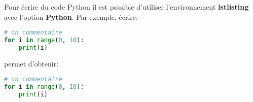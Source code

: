 Pour écrire du code Python il est possible d'utiliser l'environnement \textbf{lstlisting} avec l'option \textbf{Python}. Par exemple, écrire:
\begin{TeXlstlisting}
\begin{lstlisting}[language=Python]
# un commentaire
for i in range(0, 10):
    print(i)
\end{lstlisting}
\end{TeXlstlisting}

permet d'obtenir:

\begin{lstlisting}[language=Python]
# un commentaire
for i in range(0, 10):
    print(i)
\end{lstlisting}
